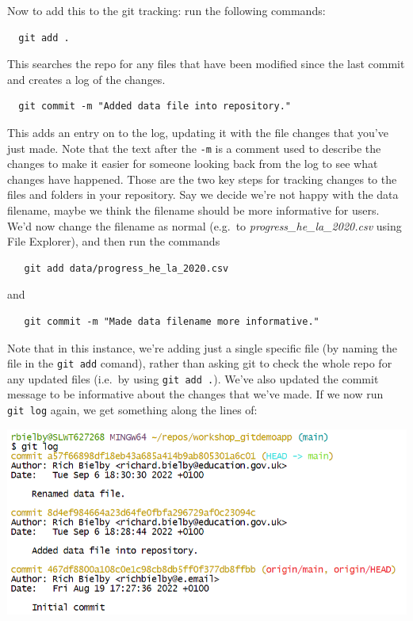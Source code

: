 \documentclass[
  12pt,
]{article}
\begin{document}
Now to add this to the git tracking: run the following commands:

\begin{verbatim}
  git add .
\end{verbatim}

This searches the repo for any files that have been modified since the
last commit and creates a log of the changes.

\begin{verbatim}
  git commit -m "Added data file into repository."
\end{verbatim}

This adds an entry on to the log, updating it with the file changes that
you've just made. Note that the text after the \texttt{-m} is a comment
used to describe the changes to make it easier for someone looking back
from the log to see what changes have happened. Those are the two key
steps for tracking changes to the files and folders in your repository.
Say we decide we're not happy with the data filename, maybe we think the
filename should be more informative for users. We'd now change the
filename as normal (e.g.~to \emph{progress\_he\_la\_2020.csv} using File
Explorer), and then run the commands

\begin{verbatim}
   git add data/progress_he_la_2020.csv
\end{verbatim}

and

\begin{verbatim}
   git commit -m "Made data filename more informative."
\end{verbatim}

Note that in this instance, we're adding just a single specific file (by
naming the file in the \texttt{git\ add} comand), rather than asking git
to check the whole repo for any updated files (i.e.~by using
\texttt{git\ add\ .}). We've also updated the commit message to be
informative about the changes that we've made. If we now run
\texttt{git\ log} again, we get something along the lines of:

\begin{center}\includegraphics[width=0.8\linewidth]{images/gitdemo/gitdemo-gitlog-2} \end{center}
\end{document}
